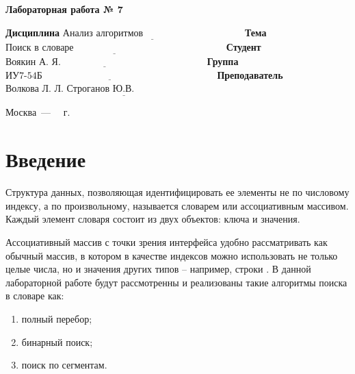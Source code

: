 \documentclass[12pt]{report}
\begin{document}
\begin{center}
\Large\textbf{Лабораторная работа № 7}
\end{center}
\vspace{\baselineskip}
\noindent\textbf{Дисциплина} $\underline{\text{Анализ алгоритмов~~~~~~~~~~~~~~~~~~~~~~~~~~~~~~~}}$\newline\newline
\noindent\textbf{Тема} $\underline{\text{Поиск в словаре~~~~~~~~~~~~~~~~~~~~~~~~~~~~~~~~~~~~~~~~~~~~~~~}}$\newline\newline
\noindent\textbf{Студент} $\underline{\text{Воякин А. Я.~~~~~~~~~~~~~~~~~~~~~~~~~~~~~~~~~~~~~~~~~~~~~}}$\newline\newline
\noindent\textbf{Группа} $\underline{\text{ИУ7-54Б~~~~~~~~~~~~~~~~~~~~~~~~~~~~~~~~~~~~~~~~~~~~~~~~~~~~~~}}$\newline\newline
\noindent\textbf{Преподаватель} $\underline{\text{Волкова Л. Л. Строганов Ю.В.~~~~~~~~~~~~~~~~~~~~~~~~~~~~~~~~~~}}$\newline

\begin{center}
	\vfill
	Москва~---~\the\year
	~г.
\end{center}
\clearpage

\tableofcontents

\newpage
\chapter*{Введение}
Структура данных, позволяющая идентифицировать ее элементы не
по числовому индексу, а по произвольному, называется словарем или ассоциативным массивом. Каждый элемент словаря состоит из двух объектов:
ключа и значения. 

Ассоциативный массив с точки зрения интерфейса удобно рассматривать как обычный массив, в котором в качестве индексов можно использовать не только целые числа, но и значения других типов – например, строки \cite{dict}.
В данной лабораторной работе будут рассмотренны и реализованы такие алгоритмы поиска в словаре как:
\begin{enumerate}
	\item полный перебор;
	\item бинарный поиск;
	\item поиск по сегментам.
\end{enumerate}
\vspace{\baselineskip}
\end{document}
